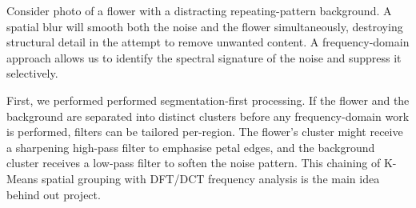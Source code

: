 \vspace{0.15in}
\noindent
Consider photo of a flower with a distracting repeating-pattern background. A spatial blur will smooth both the noise and the flower simultaneously, destroying
structural detail in the attempt to remove unwanted content. A frequency-domain approach
allows us to identify the spectral signature of the noise and suppress it selectively.

\vspace{0.15in}
\noindent
First, we performed performed segmentation-first processing. If the flower and
the background are separated into distinct clusters before any frequency-domain work is
performed, filters can be tailored per-region. The flower's cluster might receive a
sharpening high-pass filter to emphasise petal edges, and the background cluster
receives a low-pass filter to soften the noise pattern. This chaining of K-Means spatial
grouping with DFT/DCT frequency analysis is the main idea behind out project.
